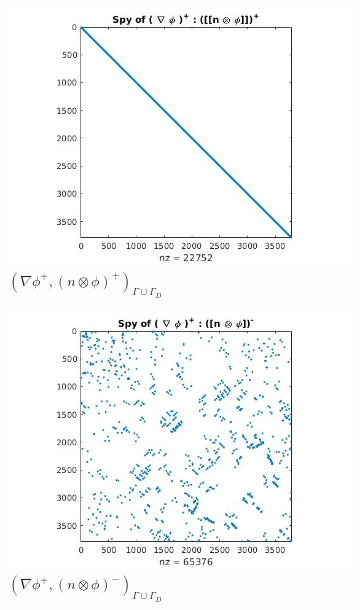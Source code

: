 \documentclass[a4paper,openany]{book}
\begin{document}
\begin{figure}
  \begin{subfigure}{0.5\textwidth}
    \includegraphics[width=\linewidth]{figure31.jpg}
\caption{$( \nabla \phi^+ ,(n \otimes \phi)^+)_{\Gamma \cup \Gamma_D}$}
  \label{fig:figure31}
  \end{subfigure}
  \begin{subfigure}{0.5\textwidth}
    \includegraphics[width=\linewidth]{figure32.jpg}
  \caption{$( \nabla \phi^+ ,(n \otimes \phi)^-)_{\Gamma \cup \Gamma_D}$}
  \label{fig:figure32}
  \end{subfigure}
    \begin{subfigure}{0.5\textwidth}

\end{subfigure}
\end{figure}
\end{document}
